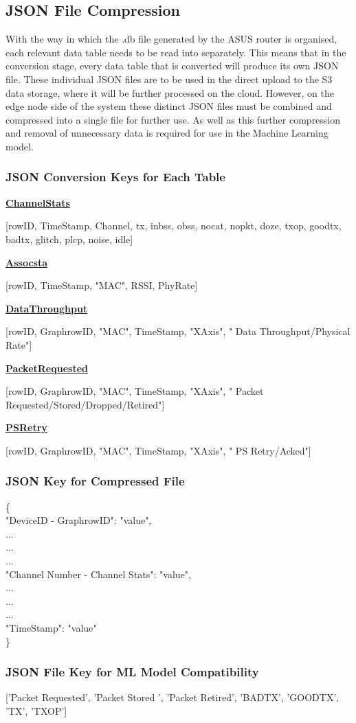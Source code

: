 \subsection{JSON File Compression}
\label{Section: JSON File Compression}


With the way in which the .db file generated by the ASUS router is organised, each relevant data table needs to be read into separately. This means that in the conversion stage, every data table that is converted will produce its own JSON file. These individual JSON files are to be used in the direct upload to the S3 data storage, where it will be further processed on the cloud. However, on the edge node side of the system these distinct JSON files must be combined and compressed into a single file for further use. As well as this further compression and removal of unnecessary data is required for use in the Machine Learning model. 

\subsubsection{JSON Conversion Keys for Each Table}

\textbf{\underline{ChannelStats}}

[rowID, TimeStamp, Channel, tx, inbss, obss, nocat, nopkt, doze, txop, goodtx, badtx, glitch, plcp, noise, idle]

\textbf{\underline{Assocsta}}

[rowID, TimeStamp, "MAC", RSSI, PhyRate]

\textbf{\underline{DataThroughput}}

[rowID, GraphrowID, "MAC", TimeStamp, "XAxis", " Data Throughput/Physical Rate"]

\textbf{\underline{PacketRequested}}

[rowID, GraphrowID, "MAC", TimeStamp, "XAxis", " Packet Requested/Stored/Dropped/Retired"]

\textbf{\underline{PSRetry}}

[rowID, GraphrowID, "MAC", TimeStamp, "XAxis", " PS Retry/Acked"]

\subsubsection{JSON Key for Compressed File}
 
\{\\
"DeviceID - GraphrowID": "value",\\
...\\
...\\
...\\
"Channel Number - Channel Stats": "value",\\
...\\
...\\
...\\
"TimeStamp": "value"\\
\}

\subsubsection{JSON File Key for ML Model Compatibility}

['Packet Requested', 'Packet Stored ', 'Packet Retired', 'BADTX', 'GOODTX', 'TX', 'TXOP']


